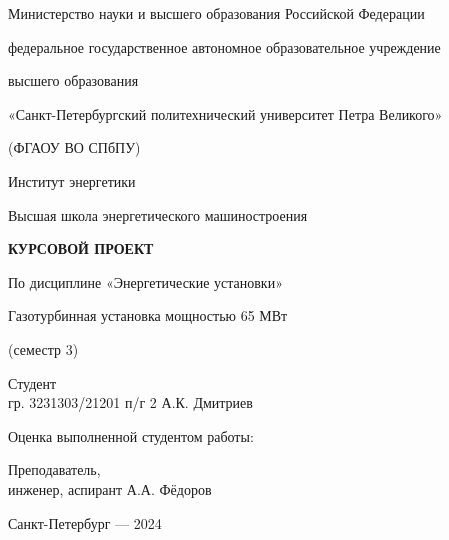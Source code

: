 \begin{titlepage}
  \linespread{1}\selectfont
  \begin{center}
    {\small Министерство науки и высшего образования Российской Федерации

    федеральное государственное автономное образовательное учреждение

    высшего образования

    «Санкт-Петербургский политехнический университет Петра Великого»

    (ФГАОУ ВО СПбПУ)

    Институт энергетики

  Высшая школа энергетического машиностроения}
  \end{center}

  \vspace{3cm}
  \linespread{1.5}\selectfont
  \begin{center}
    \begin{large}
      \textbf{КУРСОВОЙ ПРОЕКТ}
    \end{large}

    По дисциплине «Энергетические установки»

    Газотурбинная установка мощностью 65 МВт

    (семестр 3)
  \end{center}

  \vspace{3cm}
  \linespread{1}\selectfont
  \begin{flushleft}
    Студент\\ гр. 3231303/21201 п/г 2 \hspace{1cm} \hrulefill \hspace{1cm} А.К. Дмитриев

  \end{flushleft}
  \begin{center}
    Оценка выполненной студентом работы:
  \end{center}
  \begin{flushleft}

    Преподаватель,\\ инженер, аспирант \hspace{2cm} \hrulefill \hspace{1cm} А.А. Фёдоров
  \end{flushleft}

  \vfill
  \begin{center}
    Санкт-Петербург — 2024
  \end{center}
\end{titlepage}

